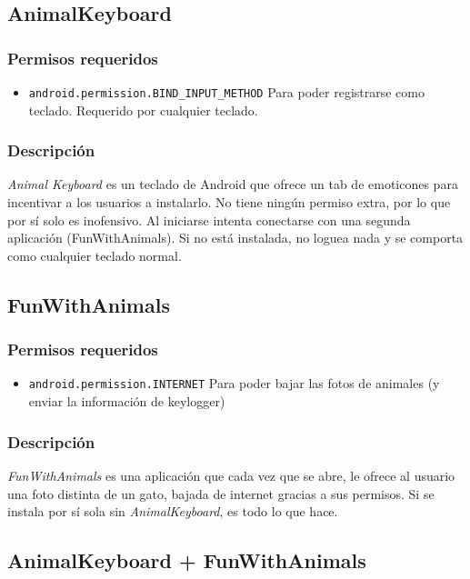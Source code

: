 	\subsection{AnimalKeyboard}
		
		\subsubsection{Permisos requeridos}
			\begin{itemize}
				\item \texttt{android.permission.BIND\_INPUT\_METHOD} Para poder registrarse como teclado. Requerido por cualquier teclado.
			\end{itemize}

		\subsubsection{Descripción}
			\emph{Animal Keyboard} es un teclado de Android que ofrece un tab de emoticones para incentivar a los usuarios a instalarlo. No tiene ning\'un permiso extra, por lo que por s\'i solo es inofensivo.	
				Al iniciarse intenta conectarse con una segunda aplicación (FunWithAnimals). Si no está instalada, no loguea nada y se comporta como cualquier teclado normal.
	
	\subsection{FunWithAnimals}
		\subsubsection{Permisos requeridos}
			\begin{itemize}
				\item \texttt{android.permission.INTERNET} Para poder bajar las fotos de animales (y enviar la información de keylogger)
			\end{itemize}
			
		\subsubsection{Descripción}
			\emph{FunWithAnimals} es una aplicación que cada vez que se abre, le ofrece al usuario una foto distinta de un gato, bajada de internet gracias a sus permisos. Si se instala por sí sola sin \emph{AnimalKeyboard}, es todo lo que hace.
			
	\subsection{AnimalKeyboard + FunWithAnimals}
	

